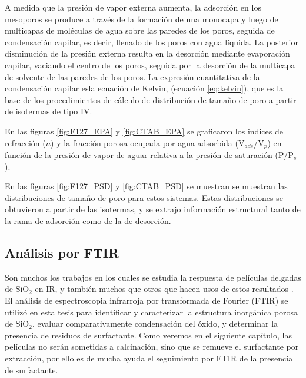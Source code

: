 		A medida que la presión de vapor externa aumenta, la adsorción en los mesoporos se produce a través de la formación de una monocapa y luego de multicapas de moléculas de agua sobre las paredes de los poros, seguida de condensación capilar, es decir, llenado de los poros con agua líquida. La posterior disminución de la presión externa resulta en la desorción mediante evaporación capilar, vaciando el centro de los poros, seguida por la desorción de la multicapa	de solvente de las paredes de los poros. La expresión cuantitativa de la condensación capilar esla ecuación de Kelvin, (ecuación \ref{eq:kelvin}), que es la base de los procedimientos de cálculo de distribución de tamaño de poro a partir de isotermas de tipo IV.\cite{Baklanov2000}
		
		En las figuras \ref{fig:F127_EPA} y \ref{fig:CTAB_EPA} se graficaron los indices de refracción ($n$) y la fracción porosa ocupada por agua adsorbida (V$_{ads}$/V$_p$) en función de la presión de vapor de aguar relativa a la presión de saturación (P/P$_s$). 

		En las figuras \ref{fig:F127_PSD} y \ref{fig:CTAB_PSD} se muestran se muestran las distribuciones de tamaño de poro para estos sistemas. Estas distribuciones se obtuvieron a partir de las isotermas, y se extrajo información estructural tanto de la rama de adsorción como de la de desorción.

	\subsection{Análisis por FTIR}\label{sec:Analisis_IR}

		Son muchos los trabajos en los cuales se estudia la respuesta de películas delgadas de SiO$_2$ en IR\cite{Olsen1989,Almeida1990,Redol1997,Innocenzi2003}, y también muchos que otros que hacen usos de estos resultados \cite{Angelome2008,Calvo2008,Calvo20210}.
		El análisis de espectroscopia infrarroja por transformada de Fourier (FTIR) se utilizó en esta tesis para identificar y caracterizar la estructura inorgánica porosa de SiO$_2$, evaluar comparativamente condensación del óxido, y determinar la presencia de residuos de surfactante. Como veremos en el siguiente capítulo, las películas no serán sometidas a calcinación, sino que se remueve el surfactante por extracción, por ello es de mucha ayuda el seguimiento por FTIR de la presencia de surfactante. 

